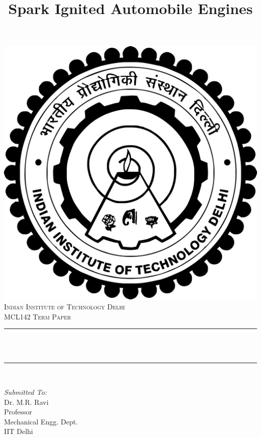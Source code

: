 \documentclass[11pt]{article}
\title{Spark Ignited Automobile Engines}								%
\makeatletter
\let\thetitle\@title
\makeatother
\begin{document}

\begin{titlepage}
	\centering
    \vspace*{0.5 cm}
    \includegraphics[scale = 0.075]{IIT_Delhi_logo.png}\\[1.0 cm]	%
    \textsc{\LARGE Indian Institute of Technology Delhi}\\[2.0 cm]	%
	\textsc{\LARGE MCL142 Term Paper}\\[0.5 cm]				%
	\rule{\linewidth}{0.2 mm} \\[0.4 cm]
	{ \huge \bfseries \thetitle}\\
	\rule{\linewidth}{0.2 mm} \\[3.5 cm]
	
	\begin{minipage}{0.4\textwidth}
		\begin{flushleft} \large
			\emph{Submitted To:}\\
			Dr. M.R. Ravi\\
			Professor\\
			Mechanical Engg. Dept.\\
			IIT Delhi
			\end{flushleft}
			\end{minipage}~
			\begin{minipage}{0.4\textwidth}
            

\end{minipage}
\end{titlepage}
\end{document}
